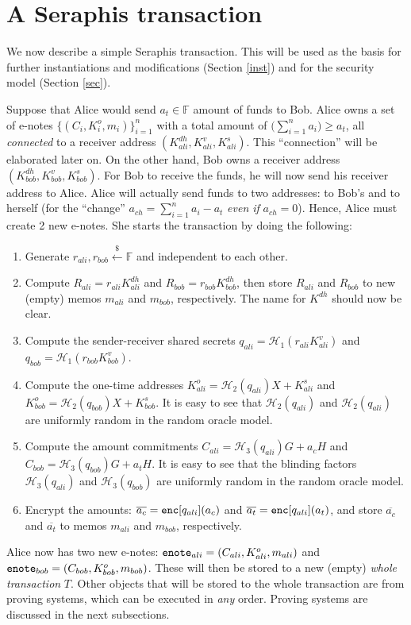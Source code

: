 \documentclass{article}
\begin{document}
\section{A Seraphis transaction}\label{ser-tx}
We now describe a simple Seraphis transaction. This will be used as the basis for further instantiations and modifications (Section \ref{inst}) and for the security model (Section \ref{sec}).

Suppose that Alice would send $a_t\in\mathbb{F}$ amount of funds to Bob. Alice owns a set of e-notes $\{(C_i,K_i^o,m_i)\}_{i=1}^n$ with a total amount of $\big(\sum_{i=1}^{n}{a_i}\big)\ge a_t$, all \textit{connected} to a receiver address $(K_{ali}^{dh}, K_{ali}^v, K_{ali}^s)$. This ``connection'' will be elaborated later on. On the other hand, Bob owns a receiver address $(K_{bob}^{dh}, K_{bob}^v, K_{bob}^s)$. For Bob to receive the funds, he will now send his receiver address to Alice. Alice will actually send funds to two addresses: to Bob's and to herself (for the ``change'' $a_{ch} = \sum_{i=1}^{n}{a_i} - a_t$ \textit{even if} $a_{ch}=0$). Hence, Alice must create 2 new e-notes. She starts the transaction by doing the following:
\begin{enumerate}
    \item Generate $r_{ali}, r_{bob}\xleftarrow{\$}\mathbb{F}$ and independent to each other.
    \item Compute $R_{ali} = r_{ali}K_{ali}^{dh}$ and $R_{bob} = r_{bob}K_{bob}^{dh}$, then store $R_{ali}$ and $R_{bob}$ to new (empty) memos $m_{ali}$ and $m_{bob}$, respectively. The name for $K^{dh}$ should now be clear.
    \item Compute the sender-receiver shared secrets $q_{ali} = \mathcal{H}_1(r_{ali}K_{ali}^{v})$ and $q_{bob} = \mathcal{H}_1(r_{bob}K_{bob}^{v})$.
    \item Compute the one-time addresses $K_{ali}^o = \mathcal{H}_2(q_{ali})X + K_{ali}^s$ and $K_{bob}^o = \mathcal{H}_2(q_{bob})X + K_{bob}^s$. It is easy to see that $\mathcal{H}_2(q_{ali})$ and $\mathcal{H}_2(q_{ali})$ are uniformly random in the random oracle model.
    \item Compute the amount commitments $C_{ali} = \mathcal{H}_3(q_{ali})G + a_c H$ and $C_{bob} = \mathcal{H}_3(q_{bob})G + a_t H$. It is easy to see that the blinding factors $\mathcal{H}_3(q_{ali})$ and $\mathcal{H}_3(q_{bob})$ are uniformly random in the random oracle model.
    \item Encrypt the amounts: $\overline{a_c} = {\tt enc}[q_{ali}](a_c)$ and $\overline{a_t} = {\tt enc}[q_{ali}](a_t)$, and store $\overline{a_c}$ and $\overline{a_t}$ to memos $m_{ali}$ and $m_{bob}$, respectively.
\end{enumerate}
Alice now has two new e-notes: ${\tt enote}_{ali} = (C_{ali}, K_{ali}^o, m_{ali})$ and ${\tt enote}_{bob} = (C_{bob}, K_{bob}^o, m_{bob})$. These will then be stored to a new (empty) \textit{whole transaction} $T$. Other objects that will be stored to the whole transaction are from proving systems, which can be executed in \textit{any} order. Proving systems are discussed in the next subsections.
\end{document}
